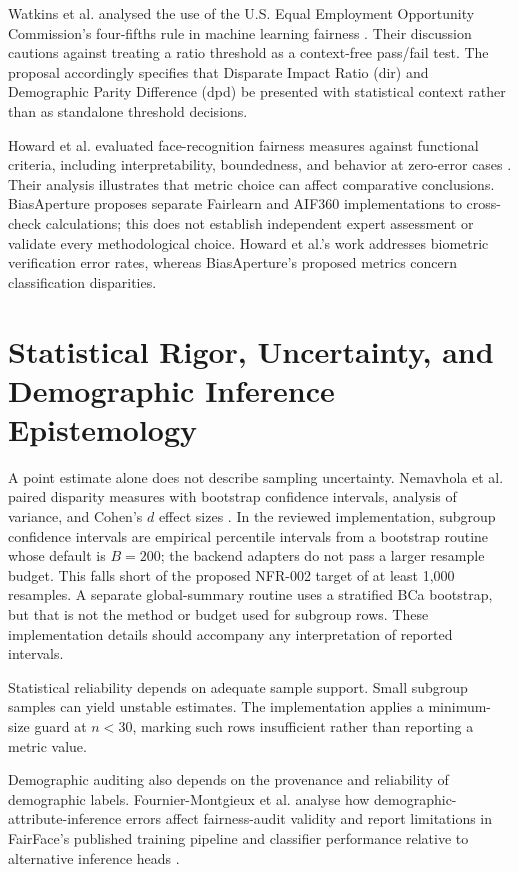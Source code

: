 Watkins et al. analysed the use of the U.S. Equal Employment Opportunity Commission's four-fifths rule in machine learning fairness \cite{watkins2022fourfifths}. Their discussion cautions against treating a ratio threshold as a context-free pass/fail test. The proposal accordingly specifies that Disparate Impact Ratio (\gls{dir}) and Demographic Parity Difference (\gls{dpd}) be presented with statistical context rather than as standalone threshold decisions.

Howard et al. evaluated face-recognition fairness measures against functional criteria, including interpretability, boundedness, and behavior at zero-error cases \cite{howard2022evaluating}. Their analysis illustrates that metric choice can affect comparative conclusions. BiasAperture proposes separate Fairlearn and AIF360 implementations to cross-check calculations; this does not establish independent expert assessment or validate every methodological choice. Howard et al.'s work addresses biometric verification error rates, whereas BiasAperture's proposed metrics concern classification disparities.


\section{Statistical Rigor, Uncertainty, and Demographic Inference Epistemology}
\label{sec:lit_statistics}

A point estimate alone does not describe sampling uncertainty. Nemavhola et al. paired disparity measures with bootstrap confidence intervals, analysis of variance, and Cohen's $d$ effect sizes \cite{nemavhola2026reassessing}. In the reviewed implementation, subgroup confidence intervals are empirical percentile intervals from a bootstrap routine whose default is \(B=200\); the backend adapters do not pass a larger resample budget. This falls short of the proposed NFR-002 target of at least 1{,}000 resamples. A separate global-summary routine uses a stratified BCa bootstrap, but that is not the method or budget used for subgroup rows. These implementation details should accompany any interpretation of reported intervals.

Statistical reliability depends on adequate sample support. Small subgroup samples can yield unstable estimates. The implementation applies a minimum-size guard at \(n<30\), marking such rows insufficient rather than reporting a metric value.

Demographic auditing also depends on the provenance and reliability of demographic labels. Fournier-Montgieux et al. analyse how demographic-attribute-inference errors affect fairness-audit validity and report limitations in FairFace's published training pipeline and classifier performance relative to alternative inference heads \cite{fourniermontgieux2025reliable}.

